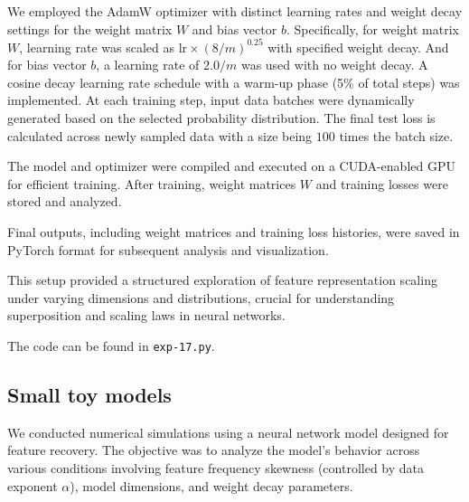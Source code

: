 \documentclass{article}
\begin{document}
We employed the AdamW optimizer with distinct learning rates and weight decay settings for the weight matrix $W$ and bias vector $b$. Specifically, for weight matrix $W$, learning rate was scaled as $\text{lr} \times (8/m)^{0.25}$ with specified weight decay. And for bias vector $b$, a learning rate of $2.0/m$ was used with no weight decay. A cosine decay learning rate schedule with a warm-up phase (5\% of total steps) was implemented. At each training step, input data batches were dynamically generated based on the selected probability distribution. The final test loss is calculated across newly sampled data with a size being $100$ times the batch size. 

The model and optimizer were compiled and executed on a CUDA-enabled GPU for efficient training. After training, weight matrices $W$ and training losses were stored and analyzed.

Final outputs, including weight matrices and training loss histories, were saved in PyTorch format for subsequent analysis and visualization.

This setup provided a structured exploration of feature representation scaling under varying dimensions and distributions, crucial for understanding superposition and scaling laws in neural networks.

The code can be found in \texttt{exp-17.py}.

\subsection{Small toy models}\label{app:small}

We conducted numerical simulations using a neural network model designed for feature recovery. The objective was to analyze the model's behavior across various conditions involving feature frequency skewness (controlled by data exponent \(\alpha\)), model dimensions, and weight decay parameters.
\end{document}
